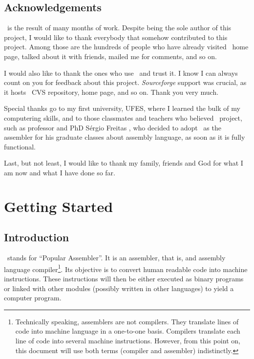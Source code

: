 \documentclass[a4paper,draft,12pt]{book}
\begin{document}
\chapter*{Acknowledgements}
\popasm\ is the result of many months of work. Despite being the
sole author of this project, I would like to
thank everybody that somehow contributed to this project. Among those
are the hundreds of people who have already
visited \popasm\ home page, talked about it with friends, mailed
me for comments, and so on.

I would also like to thank the ones who use \popasm\ and trust it.
I know I can always count on you for
feedback about this project. \emph{Sourceforge} support was crucial, as
it hosts \popasm\ CVS repository,
home page, and so on. Thank you very much.

Special thanks go to my first university, UFES\cite{UFES}, where
I learned the bulk of my computering skills, and
to those classmates and teachers who believed \popasm\ project,
such as professor and PhD S\'ergio Freitas%
\cite{FREITAS}, who decided to adopt \popasm\ as the assembler for
his graduate classes about assembly language, as soon as it is
fully functional.

Last, but not least, I would like to thank my family, friends and God
for what I am now and what I have done so far.

\tableofcontents
\newpage
\listoftables
\newpage
\listoffigures
\newpage

\part{Getting Started}

\chapter{Introduction}
\popasm\ stands for ``Popular Assembler''. It is an assembler,
that is, and assembly language compiler\footnote{Technically
speaking, assemblers are not compilers. They translate lines of code
into machine language in a one-to-one basis. Compilers
translate each line of code into several machine instructions. However,
from this point on, this document will use both
terms (compiler and assembler) indistinctly.}. Its objective is to
convert human readable code into machine instructions.
These instructions will then be either executed as binary programs or
linked with other modules (possibly written in
other languages) to yield a computer program.
\end{document}
